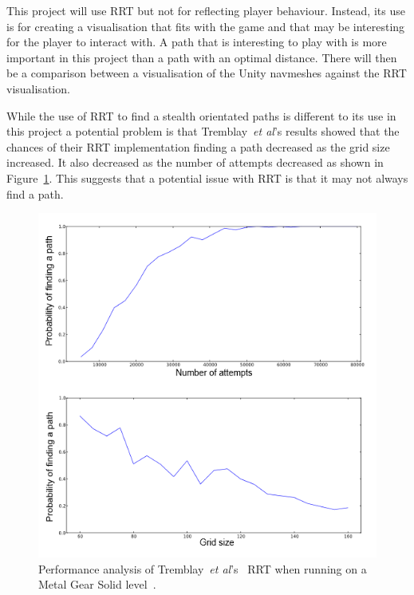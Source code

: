 \documentclass[journal]{IEEEtran}
\begin{document}
	This project will use RRT but not for reflecting player behaviour.  Instead, its use is for creating a visualisation that fits with the game and that may be interesting for the player to interact with. A path that is interesting to play with is more important in this project than a path with an optimal distance. There will then be a comparison between a visualisation of the Unity navmeshes against the RRT visualisation.
	
	While the use of RRT to find a stealth orientated paths is different to its use in this project a potential problem is that Tremblay~\textit{et al}'s results showed that the chances of their RRT implementation finding a path decreased as the grid size increased. It also decreased as the number of attempts decreased as shown in Figure~\ref{TremblayRRT}.  This suggests that a potential issue with RRT is that it may not always find a path.
	
	\begin{figure}[h]
		\includegraphics[width=1.0\linewidth]{Tremblay2013.png}
		\caption{ Performance analysis of Tremblay~\textit{et al}'s~\cite{Tremblay2013} RRT when running on a Metal Gear Solid level~\cite{game:MetalGearSolid}.}
		\label{TremblayRRT}
	\end{figure} 
	
\end{document}
